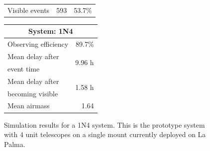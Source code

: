 \begin{colsection}
\begin{colsection}
\begin{figure}[p]
\begin{center}
\begin{minipage}[t]{0.37\textwidth}
\begin{tabular}{lrr}
                \midrule
                Visible events & 593 &  53.7\% \\
            \end{tabular}
        \end{minipage}
        \begin{minipage}[t]{0.35\textwidth}\vspace{0pt}
            \begin{tabular}{lr}
                \multicolumn{2}{c}{\textbf{System: 1N4}} \\
                \midrule
                Observing efficiency & 89.7\% \\
                \midrule
                Mean delay after     & \multirow{2}{*}{9.96 h} \\
                event time           & \\
                Mean delay after     & \multirow{2}{*}{1.58 h} \\
                becoming visible     & \\
                \midrule
                Mean airmass         & 1.64 \\
            \end{tabular}
        \end{minipage}
    \end{center}
    \caption[GW simulation results: 1N4 system]{
        Simulation results for a 1N4 system. This is the prototype system with 4 unit telescopes on a single mount currently deployed on La Palma.
    }\label{fig:gw_sim_1n4}
\end{figure}


\end{colsection}
\end{colsection}
